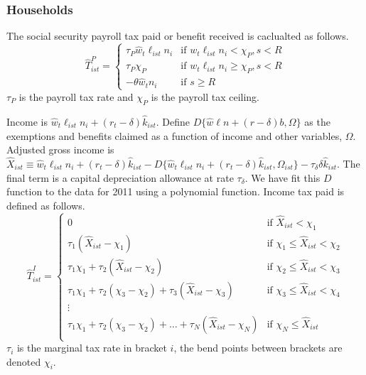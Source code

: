 \documentclass[letterpaper,12pt]{article}
\theoremstyle{definition}
\numberwithin{equation}{section}
\begin{document}
\begin{spacing}{1.5}
    \subsubsection{Households}
      The social security payroll tax paid or benefit received is caclualted as follows.
      \begin{equation}\label{Macro_HHTax_PayrollTax}
      \hat T^P_{ist} = \left\{ \begin{matrix} \tau_P \hat w_t \ell_{ist} n_i & \text{if } w_t \ell_{ist} n_i < \chi_P, s<R \\
                                         \tau_P \chi_P & \text{if } w_t \ell_{ist} n_i \ge \chi_P, s<R \\
                                         -\theta \hat w_t n_i & \text{if } s\ge R
                                         \end{matrix} \right.
      \end{equation}
      $\tau_P$ is the payroll tax rate and $\chi_P$ is the payroll tax ceiling.

      Income is $\hat w_t \ell_{ist} n_i + (r_t-\delta) \hat k_{ist}$.  Define $D\{\hat w\ell n+(r-\delta)b,\Omega\}$ as the exemptions and benefits claimed as a function of income and other variables, $\Omega$.  Adjusted gross income is $\hat X_{ist} \equiv \hat w_t \ell_{ist} n_i + (r_t-\delta) \hat k_{ist} - D\{\hat w_t \ell_{ist} n_i + (r_t-\delta) \hat k_{ist},\Omega_{ist}\} -\tau_\delta \delta \hat k_{ist}$.  The final term is a capital depreciation allowance at rate $\tau_\delta$.  We have fit this $D$ function to the data for 2011 using a polynomial function.  Income tax paid is defined as follows.
      \begin{equation}\label{Macro_HHTax_IncomeTax}
      \hat T^I_{ist} = \left\{ \begin{matrix} 0 & \text{if } \hat X_{ist} < \chi_1 \\
                  \tau_1 (\hat X_{ist} - \chi_1) & \text{if }  \chi_1 \le \hat X_{ist} < \chi_2 \\
                  \tau_1 \chi_1 + \tau_2 (\hat X_{ist} - \chi_2) & \text{if }  \chi_2 \le \hat X_{ist} < \chi_3 \\
                  \tau_1 \chi_1 + \tau_2 (\chi_3 - \chi_2) + \tau_3 (\hat X_{ist} - \chi_3) & \text{if }  \chi_3 \le \hat X_{ist} < \chi_4 \\
                  \vdots \\
                  \tau_1 \chi_1 + \tau_2 (\chi_3 - \chi_2) +\dots+ \tau_N (\hat X_{ist} - \chi_N) & \text{if }  \chi_N \le \hat X_{ist} \\
                  \end{matrix} \right.
      \end{equation}
      $\tau_i$ is the marginal tax rate in bracket $i$, the bend points between brackets are denoted $\chi_i$.


\end{spacing}
\end{document}
